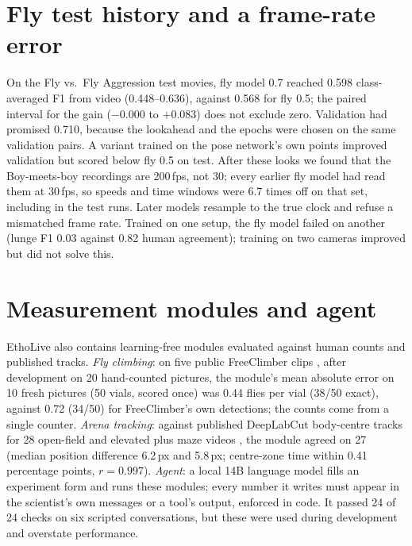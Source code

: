 \documentclass[10pt]{article}
\begin{document}



\appendix

\section{Fly test history and a frame-rate error}
\label{app:fly}

On the Fly vs.\ Fly Aggression test movies, fly model 0.7 reached 0.598 class-averaged F1 from video (0.448--0.636), against 0.568 for fly 0.5; the paired interval for the gain ($-0.000$ to $+0.083$) does not exclude zero. Validation had promised 0.710, because the lookahead and the epochs were chosen on the same validation pairs. A variant trained on the pose network's own points improved validation but scored below fly 0.5 on test. After these looks we found that the Boy-meets-boy recordings are 200\,fps, not 30; every earlier fly model had read them at 30\,fps, so speeds and time windows were 6.7 times off on that set, including in the test runs. Later models resample to the true clock and refuse a mismatched frame rate. Trained on one setup, the fly model failed on another (lunge F1 0.03 against 0.82 human agreement); training on two cameras improved but did not solve this.

\section{Measurement modules and agent}
\label{app:modules}

EthoLive also contains learning-free modules evaluated against human counts and published tracks. \emph{Fly climbing}: on five public FreeClimber clips \citep{spierer2021freeclimber}, after development on 20 hand-counted pictures, the module's mean absolute error on 10 fresh pictures (50 vials, scored once) was 0.44 flies per vial (38/50 exact), against 0.72 (34/50) for FreeClimber's own detections; the counts come from a single counter. \emph{Arena tracking}: against published DeepLabCut body-centre tracks for 28 open-field and elevated plus maze videos \citep{sturman2020deep}, the module agreed on 27 (median position difference 6.2\,px and 5.8\,px; centre-zone time within 0.41 percentage points, $r=0.997$). \emph{Agent}: a local 14B language model \citep{qwen3} fills an experiment form and runs these modules; every number it writes must appear in the scientist's own messages or a tool's output, enforced in code. It passed 24 of 24 checks on six scripted conversations, but these were used during development and overstate performance.
\end{document}
